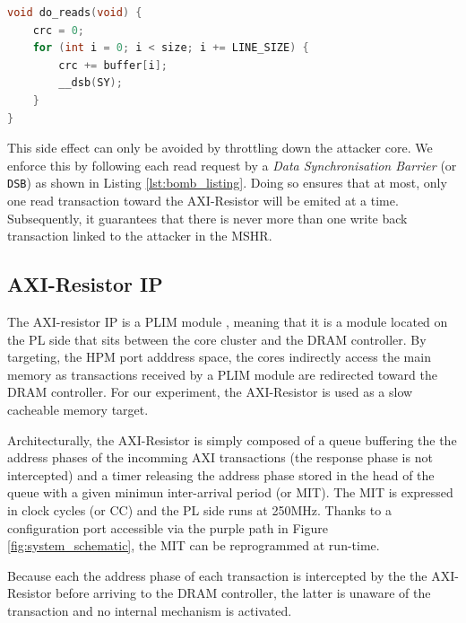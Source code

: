        \begin{lstlisting}[language=C, caption={Read memory-bomb code}, label={lst:bomb_listing}, basicstyle=\small, captionpos=b]
void do_reads(void) {
    crc = 0;
    for (int i = 0; i < size; i += LINE_SIZE) {
        crc += buffer[i];
        __dsb(SY);
    }
}
        \end{lstlisting}

        This side effect can only be avoided by throttling down the attacker core. We enforce this by following each read request by a \emph{Data Synchronisation Barrier} (or \texttt{DSB}) as shown in Listing \ref{lst:bomb_listing}. Doing so ensures that at most, only one read transaction toward the AXI-Resistor will be emited at a time. Subsequently, it guarantees that there is never more than one write back transaction linked to the attacker in the MSHR.

    \subsection{AXI-Resistor IP}
        \label{subsec:axi-resistor}

        The AXI-resistor IP is a PLIM module \cite{PLIM20}, meaning that it is a module located on the PL side that sits between the core cluster and the DRAM controller. By targeting, the HPM port adddress space, the cores indirectly access the main memory as transactions received by a PLIM module are redirected toward the DRAM controller.  For our experiment, the AXI-Resistor is used as a slow cacheable memory target.

        Architecturally, the AXI-Resistor is simply composed of a queue buffering the the address phases of the incomming AXI transactions \cite{ARM-AXI} (the response phase is not intercepted) and a timer releasing the address phase stored in the head of the queue with a given minimun inter-arrival period (or MIT). The MIT is expressed in clock cycles (or CC) and the PL side runs at 250MHz. Thanks to a configuration port accessible via the purple path in Figure \ref{fig:system_schematic}, the MIT can be reprogrammed at run-time.

        Because each the address phase of each transaction is intercepted by the the AXI-Resistor before arriving to the DRAM controller, the latter is unaware of the transaction and no internal mechanism is activated.
